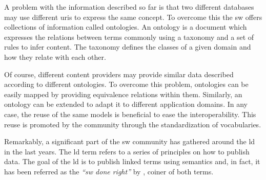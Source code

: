 \begin{savenotes}
\end{savenotes}


A problem with the information described so far is that two different databases may use different \acs{uri}s to express the same concept.
To overcome this the \ac{sw} offers collections of information called ontologies.
An ontology is a document which expresses the relations between terms commonly using a taxonomy and a set of rules to infer content.
The taxonomy defines the classes of a given domain and how they relate with each other.


Of course, different content providers may provide similar data described according to different ontologies.
To overcome this problem, ontologies can be easily mapped by providing equivalence relations within them.
Similarly, an ontology can be extended to adapt it to different application domains.
In any case, the reuse of the same models is beneficial to ease the interoperability.
This reuse is promoted by the community through the standardization of vocabularies.

Remarkably, a significant part of the \ac{sw} community has gathered around the \ac{ld} in the last years. 
The \acl{ld} \citep{bizer_linked_2009} term refers to a series of principles on how to publish data.
The goal of the \ac{ld} is to publish linked terms using semantics and, in fact, it has been referred as the \emph{``\acl{sw} done right''} by \citet{lee_linked_2008}, coiner of both terms.